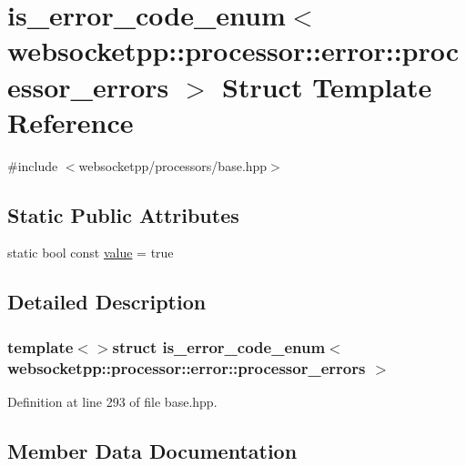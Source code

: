 \hypertarget{structis__error__code__enum_3_01websocketpp_1_1processor_1_1error_1_1processor__errors_01_4}{}\section{is\+\_\+error\+\_\+code\+\_\+enum$<$ websocketpp\+:\+:processor\+:\+:error\+:\+:processor\+\_\+errors $>$ Struct Template Reference}
\label{structis__error__code__enum_3_01websocketpp_1_1processor_1_1error_1_1processor__errors_01_4}


{\ttfamily \#include $<$websocketpp/processors/base.\+hpp$>$}

\subsection*{Static Public Attributes}
\begin{DoxyCompactItemize}
\item 
static bool const \hyperlink{structis__error__code__enum_3_01websocketpp_1_1processor_1_1error_1_1processor__errors_01_4_a981549f083d0fb7c2c7afa8184e59056}{value} = true
\end{DoxyCompactItemize}


\subsection{Detailed Description}
\subsubsection*{template$<$$>$struct is\+\_\+error\+\_\+code\+\_\+enum$<$ websocketpp\+::processor\+::error\+::processor\+\_\+errors $>$}



Definition at line 293 of file base.\+hpp.



\subsection{Member Data Documentation}
\hypertarget{structis__error__code__enum_3_01websocketpp_1_1processor_1_1error_1_1processor__errors_01_4_a981549f083d0fb7c2c7afa8184e59056}{}
